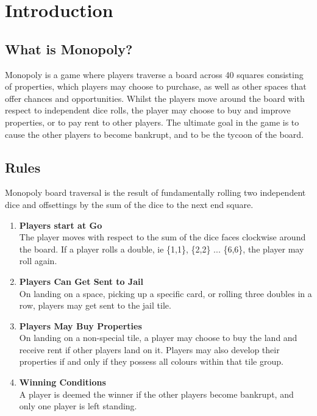 \documentclass[12pt]{article}
\begin{document}
\tableofcontents
{}
\thispagestyle{empty}
\cleardoublepage
\setcounter{page}{1}


\section{Introduction}
\subsection{What is Monopoly?}
Monopoly is a game where players traverse a board across 40 squares consisting of properties, which players may choose to purchase, as well as other spaces that offer chances and opportunities. Whilst the players move around the board with respect to independent dice rolls, the player may choose to buy and improve properties, or to pay rent to other players. The ultimate goal in the game is to cause the other players to become bankrupt, and to be the tycoon of the board.
\subsection{Rules}
Monopoly board traversal is the result of fundamentally rolling two independent dice and offsettings by the sum of the dice to the next end square.
\begin{enumerate}
  \item \textbf{Players start at Go} \hfill \\
  The player moves with respect to the sum of the dice faces clockwise around the board. If a player rolls a double, ie \{1,1\}, \{2,2\} ... \{6,6\}, the player may roll again.
  \item \textbf{Players Can Get Sent to Jail} \hfill \\
  On landing on a space, picking up a specific card, or rolling three doubles in a row, players may get sent to the jail tile.
  \item \textbf{Players May Buy Properties} \hfill \\
  On landing on a non-special tile, a player may choose to buy the land and receive rent if other players land on it. Players may also develop their properties if and only if they possess all colours within that tile group.
  \item \textbf{Winning Conditions} \hfill \\
  A player is deemed the winner if the other players become bankrupt, and only one player is left standing.
\end{enumerate}
\end{document}
